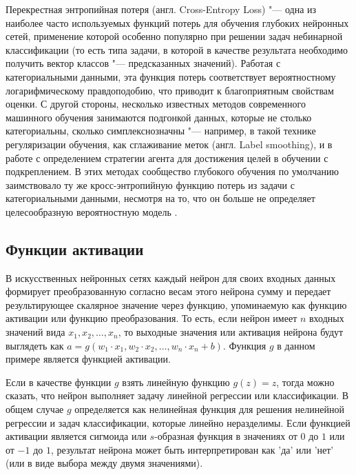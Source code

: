 \documentclass[bachelor, och, coursework]{SCWorks}
\begin{document}
        Перекрестная энтропийная потеря (англ. Cross-Entropy Loss) "--- одна из
        наиболее часто используемых функций потерь для обучения глубоких
        нейронных сетей, применение которой особенно популярно при решении задач
        небинарной классификации (то есть типа задачи, в которой в качестве
        результата необходимо получить вектор классов "--- предсказанных
        значений). Работая с категориальными данными, эта функция потерь
        соответствует вероятностному логарифмическому правдоподобию, что
        приводит к благоприятным свойствам оценки. С другой стороны, несколько
        известных методов современного машинного обучения занимаются подгонкой
        данных, которые не столько категориальны, сколько симплекснозначны "---
        например, в такой технике регуляризации обучения, как сглаживание меток
        (англ. Label smoothing), и в работе с определением стратегии агента для
        достижения целей в обучении с подкреплением. В этих методах сообщество
        глубокого обучения по умолчанию заимствовало ту же кросс-энтропийную
        функцию потерь из задачи с категориальными данными, несмотря на то, что
        он больше не определяет целесообразную вероятностную модель
        \cite{celoss2}.

    \subsection{Функции активации}

        В искусственных нейронных сетях каждый нейрон для своих входных данных
        формирует преобразованную согласно весам этого нейрона сумму и передает
        результирующее скалярное значение через функцию, упоминаемую как функцию
        активации или функцию преобразования. То есть, если нейрон имеет $n$
        входных значений вида $x_1, x_2, \ldots, x_n$, то выходные значения или
        активация нейрона будут выглядеть как $a = g(w_1 \cdot x_1, w_2 \cdot
        x_2, \ldots, w_n \cdot x_n + b)$. Функция $g$ в данном примере является
        функцией активации.
        
        Если в качестве функции $g$ взять линейную функцию $g(z) = z$, тогда
        можно сказать, что нейрон выполняет задачу линейной регрессии или
        классификации. В общем случае $g$ определяется как нелинейная функция
        для решения нелинейной регрессии и задач классификации, которые линейно
        неразделимы. Если функцией активации является сигмоида или $s$-образная
        функция в значениях от $0$ до $1$ или от $-1$ до $1$, результат нейрона
        может быть интерпретирован как 'да' или 'нет' (или в виде выбора между
        двумя значениями).
        
\end{document}
